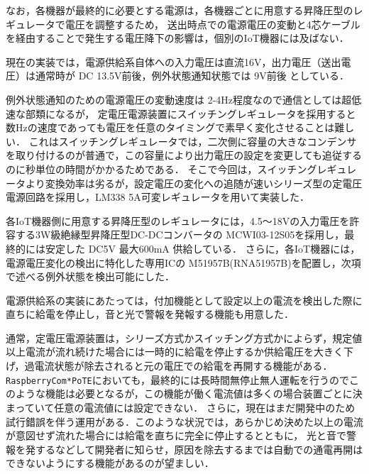 なお，各機器が最終的に必要とする電源は，各機器ごとに用意する昇降圧型のレギュレータで電圧を調整するため，
送出時点での電源電圧の変動と4芯ケーブルを経由することで発生する電圧降下の影響は，個別のIoT機器には及ばない．

現在の実装では，電源供給系自体への入力電圧は直流16V，出力電圧（送出電圧）は通常時が DC 13.5V前後，例外状態通知状態では 9V前後 としている．

例外状態通知のための電源電圧の変動速度は 2-4Hz程度なので通信としては超低速な部類になるが，
定電圧電源装置にスイッチングレギュレータを採用すると数Hzの速度であっても電圧を任意のタイミングで素早く変化させることは難しい．
これはスイッチングレギュレータでは，二次側に容量の大きなコンデンサを取り付けるのが普通で，この容量により出力電圧の設定を変更しても追従するのに秒単位の時間がかかるためである．
そこで今回は，スイッチングレギュレータより変換効率は劣るが，設定電圧の変化への追随が速いシリーズ型の定電圧電源回路を採用し，LM338 5A可変レギュレータ\cite{data:LM338}を用いて実装した．



各IoT機器側に用意する昇降圧型のレギュレータには，4.5〜18Vの入力電圧を許容する3W級絶縁型昇降圧型DC-DCコンバータの MCWI03-12S05\cite{data:MCWI03-12S05}を採用し，最終的には安定した DC5V 最大600mA 供給している．
さらに，各IoT機器には，電源電圧変化の検出に特化した専用ICの M51957B(RNA51957B)\cite{data:M51957B}を配置し，次項で述べる例外状態を検出可能にした．






電源供給系の実装にあたっては，付加機能として設定以上の電流を検出した際に直ちに給電を停止し，音と光で警報を発報する機能も用意した．

通常，定電圧電源装置は，シリーズ方式かスイッチング方式かによらず，規定値以上電流が流れ続けた場合には一時的に給電を停止するか供給電圧を大きく下げ，過電流状態が除去されると元の電圧での給電を再開する機能がある．
{\tt Raspberry\-Com*PoTE}においても，最終的には長時間無停止無人運転を行うのでこのような機能は必要となるが，この機能が働く電流値は多くの場合装置ごとに決まっていて任意の電流値には設定できない．
さらに，現在はまだ開発中のため試行錯誤を伴う運用がある．このような状況では，あらかじめ決めた以上の電流が意図せず流れた場合には給電を直ちに完全に停止するとともに，
光と音で警報を発するなどして開発者に知らせ，原因を除去するまでは自動での通電再開はできないようにする機能があるのが望ましい．

